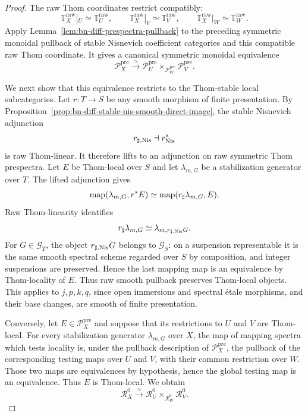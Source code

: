 \begin{proof}
The raw Thom coordinates restrict compatibly:
\[
    \mathbb T_X^{\mathrm{raw}}|_U\simeq\mathbb T_U^{\mathrm{raw}},
    \qquad
    \mathbb T_X^{\mathrm{raw}}|_V\simeq\mathbb T_V^{\mathrm{raw}},
    \qquad
    \mathbb T_X^{\mathrm{raw}}|_W\simeq\mathbb T_W^{\mathrm{raw}}.
\]
Apply Lemma~\ref{lem:bn-diff-prespectra-pullback} to the preceding symmetric
monoidal pullback of stable Nisnevich coefficient categories and this
compatible raw Thom coordinate.  It gives a canonical symmetric monoidal
equivalence
\[
    \boxed{
    \mathcal P_X^{\mathrm{pre}}
    \xrightarrow{\simeq}
    \mathcal P_U^{\mathrm{pre}}
    \times_{\mathcal P_W^{\mathrm{pre}}}
    \mathcal P_V^{\mathrm{pre}}.
    }
\]

We next show that this equivalence restricts to the Thom-stable local
subcategories.  Let $r:T\to S$ be any smooth morphism of finite presentation.
By Proposition~\ref{prop:bn-diff-stable-nis-smooth-direct-image}, the stable
Nisnevich adjunction
\[
    r_{\sharp,\mathrm{Nis}}\dashv r^*_{\mathrm{Nis}}
\]
is raw Thom-linear.  It therefore lifts to an adjunction on raw symmetric
Thom prespectra.  Let $E$ be Thom-local over $S$ and let
$\lambda_{m,G}$ be a stabilization generator over $T$.  The lifted adjunction
gives
\[
    \operatorname{map}(\lambda_{m,G},r^*E)
    \simeq
    \operatorname{map}(r_\sharp\lambda_{m,G},E).
\]
Raw Thom-linearity identifies
\[
    r_\sharp\lambda_{m,G}
    \simeq
    \lambda_{m,r_{\sharp,\mathrm{Nis}}G}.
\]
For $G\in\mathcal G_T$, the object $r_{\sharp,\mathrm{Nis}}G$ belongs to
$\mathcal G_S$: on a suspension representable it is the same smooth spectral
scheme regarded over $S$ by composition, and integer suspensions are
preserved.  Hence the last mapping map is an equivalence by Thom-locality of
$E$.  Thus raw smooth pullback preserves Thom-local objects.  This applies to
$j,p,k,q$, since open immersions and spectral \'etale morphisms, and their base
changes, are smooth of finite presentation.

Conversely, let $E\in\mathcal P_X^{\mathrm{pre}}$ and suppose that its
restrictions to $U$ and $V$ are Thom-local.  For every stabilization generator
$\lambda_{m,G}$ over $X$, the map of mapping spectra which tests locality is,
under the pullback description of $\mathcal P_X^{\mathrm{pre}}$, the pullback
of the corresponding testing maps over $U$ and $V$, with their common
restriction over $W$.  Those two maps are equivalences by hypothesis, hence
the global testing map is an equivalence.  Thus $E$ is Thom-local.  We obtain
\[
    \boxed{
    \mathcal R_X^0
    \xrightarrow{\simeq}
    \mathcal R_U^0
    \times_{\mathcal R_W^0}
    \mathcal R_V^0.
    }
\]


\end{proof}
